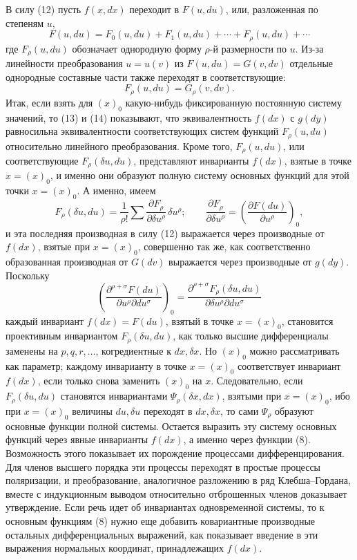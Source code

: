 \documentclass[11pt]{article}
\begin{document}
В силу (12) пусть \(f(x,dx)\) переходит в \(F(u,du)\), или, разложенная по степеням \(u\),
\begin{equation}
F(u,du)=F_0(u,du)+F_1(u,du)+\cdots+F_\rho(u,du)+\cdots
\tag{13}
\end{equation}
где \(F_\rho(u,du)\) обозначает однородную форму \(\rho\)-й размерности по \(u\). Из-за линейности преобразования \(u=u(v)\) из \(F(u,du)=G(v,dv)\) отдельные однородные составные части также переходят в соответствующие:
\begin{equation}
F_\rho(u,du)=G_\rho(v,dv).
\tag{14}
\end{equation}
Итак, если взять для \((x)_0\) какую-нибудь фиксированную постоянную систему значений, то (13) и (14) показывают, что эквивалентность \(f(dx)\) с \(g(dy)\) равносильна эквивалентности соответствующих систем функций \(F_\rho(u,du)\) относительно линейного преобразования. Кроме того, \(F_\rho(u,du)\), или соответствующие \(F_\rho(\delta u,du)\), представляют инварианты \(f(dx)\), взятые в точке \(x=(x)_0\), и именно они образуют полную систему основных функций для этой точки \(x=(x)_0\). А именно, имеем
\[
F_\rho(\delta u,du)=\frac1{\rho!}\sum
\frac{\partial F_\rho}{\partial \delta u^\rho}\,\delta u^\rho;
\qquad
\frac{\partial F_\rho}{\partial \delta u^\rho}
=\left(\frac{\partial F(du)}{\partial u^\rho}\right)_0,
\]
и эта последняя производная в силу (12) выражается через производные от \(f(dx)\), взятые при \(x=(x)_0\), совершенно так же, как соответственно образованная производная от \(G(dv)\) выражается через производные от \(g(dy)\). Поскольку
\[
\left(\frac{\partial^{\rho+\sigma}F(du)}
{\partial u^\rho\partial du^\sigma}\right)_0
=
\frac{\partial^{\rho+\sigma}F_\rho(\delta u,du)}
{\partial\delta u^\rho\partial du^\sigma}
\]
каждый инвариант \(f(dx)=F(du)\), взятый в точке \(x=(x)_0\), становится проективным инвариантом \(F_\rho(\delta u,du)\), как только высшие дифференциалы заменены на \(p,q,r,\ldots\), когредиентные к \(dx,\delta x\). Но \((x)_0\) можно рассматривать как параметр; каждому инварианту в точке \(x=(x)_0\) соответствует инвариант \(f(dx)\), если только снова заменить \((x)_0\) на \(x\). Следовательно, если \(F_\rho(\delta u,du)\) становятся инвариантами \(\Psi_\rho(\delta x,dx)\), взятыми при \(x=(x)_0\), ибо при \(x=(x)_0\) величины \(du,\delta u\) переходят в \(dx,\delta x\), то сами \(\Psi_\rho\) образуют основные функции полной системы. Остается выразить эту систему основных функций через явные инварианты \(f(dx)\), а именно через функции (8). Возможность этого показывает их порождение процессами дифференцирования. Для членов высшего порядка эти процессы переходят в простые процессы поляризации, и преобразование, аналогичное разложению в ряд Клебша--Гордана, вместе с индукционным выводом относительно отброшенных членов доказывает утверждение. Если речь идет об инвариантах одновременной системы, то к основным функциям (8) нужно еще добавить ковариантные производные остальных дифференциальных выражений, как показывает введение в эти выражения нормальных координат, принадлежащих \(f(dx)\).
\end{document}
